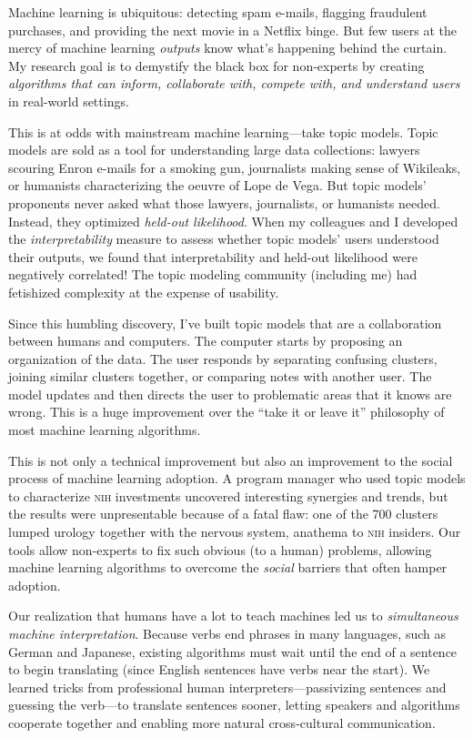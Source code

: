 \documentclass[11pt, amssymb, a4paper, one column]{article}
\begin{document}
Machine learning is ubiquitous: detecting spam e-mails, flagging fraudulent
purchases, and providing the next movie in a Netflix binge.  But few users at
the mercy of machine learning \emph{outputs} know what's happening behind the
curtain.  My research goal is to demystify the black box for non-experts by
creating \emph{algorithms that can inform, collaborate with, compete with, and
  understand users} in real-world settings.

This is at odds with mainstream machine learning---take topic models.  Topic
models are sold as a tool for understanding large data collections: lawyers
scouring Enron e-mails for a smoking gun, journalists making sense of Wikileaks,
or humanists characterizing the oeuvre of Lope de Vega.  But topic models'
proponents never asked what those lawyers, journalists, or humanists
needed. Instead, they optimized \emph{held-out likelihood}. When my colleagues
and I developed the \emph{interpretability} measure to assess whether topic
models' users understood their outputs, we found that interpretability and
held-out likelihood were negatively correlated! The topic
modeling community (including me) had fetishized complexity at the expense of
usability.

Since this humbling discovery, I've built topic models that are a collaboration
between humans and computers.  The computer starts by proposing an organization
of the data.  The user responds by separating confusing clusters, joining
similar clusters together, or comparing notes with another
user.  The model updates and then directs the user to
problematic areas that it knows are wrong.  This is a huge improvement over the
``take it or leave it'' philosophy of most machine learning algorithms.

This is not only a technical improvement but also an improvement to the social
process of machine learning adoption. A program manager who used topic models to
characterize \textsc{nih} investments uncovered interesting synergies and
trends, but the results were unpresentable because of a fatal flaw: one of the
700 clusters lumped urology together with the nervous system, anathema to
\textsc{nih} insiders. Our tools allow non-experts to fix such
obvious (to a human) problems, allowing machine learning
algorithms to overcome the \emph{social} barriers that often hamper adoption.


Our realization that humans have a lot to teach machines led us to
\emph{simultaneous machine interpretation}. Because verbs end phrases
in many languages, such as German and Japanese, existing algorithms
must wait until the end of a sentence to begin translating (since
English sentences have verbs near the start). We learned tricks from
professional human interpreters---passivizing sentences and guessing
the verb---to translate sentences sooner, letting
speakers and algorithms cooperate together and enabling more natural
cross-cultural communication.
\end{document}
